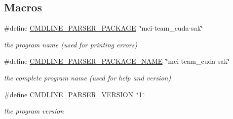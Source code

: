 \subsection*{Macros}
\begin{DoxyCompactItemize}
\item 
\hypertarget{cuda-sakgengetopt_8h_aeb847973552c32bcbe5f14973a0a8a32}{\#define \hyperlink{cuda-sakgengetopt_8h_aeb847973552c32bcbe5f14973a0a8a32}{C\-M\-D\-L\-I\-N\-E\-\_\-\-P\-A\-R\-S\-E\-R\-\_\-\-P\-A\-C\-K\-A\-G\-E}~\char`\"{}mei-\/team\-\_\-cuda-\/sak\char`\"{}}\label{cuda-sakgengetopt_8h_aeb847973552c32bcbe5f14973a0a8a32}

\begin{DoxyCompactList}\small\item\em the program name (used for printing errors) \end{DoxyCompactList}\item 
\hypertarget{cuda-sakgengetopt_8h_ae2f94765d0d8758ddf6b326a4806d6ff}{\#define \hyperlink{cuda-sakgengetopt_8h_ae2f94765d0d8758ddf6b326a4806d6ff}{C\-M\-D\-L\-I\-N\-E\-\_\-\-P\-A\-R\-S\-E\-R\-\_\-\-P\-A\-C\-K\-A\-G\-E\-\_\-\-N\-A\-M\-E}~\char`\"{}mei-\/team\-\_\-cuda-\/sak\char`\"{}}\label{cuda-sakgengetopt_8h_ae2f94765d0d8758ddf6b326a4806d6ff}

\begin{DoxyCompactList}\small\item\em the complete program name (used for help and version) \end{DoxyCompactList}\item 
\hypertarget{cuda-sakgengetopt_8h_a1eeca7dc254bf6867ba9635f45771471}{\#define \hyperlink{cuda-sakgengetopt_8h_a1eeca7dc254bf6867ba9635f45771471}{C\-M\-D\-L\-I\-N\-E\-\_\-\-P\-A\-R\-S\-E\-R\-\_\-\-V\-E\-R\-S\-I\-O\-N}~\char`\"{}1.\char`\"{}}\label{cuda-sakgengetopt_8h_a1eeca7dc254bf6867ba9635f45771471}

\begin{DoxyCompactList}\small\item\em the program version \end{DoxyCompactList}\end{DoxyCompactItemize}
